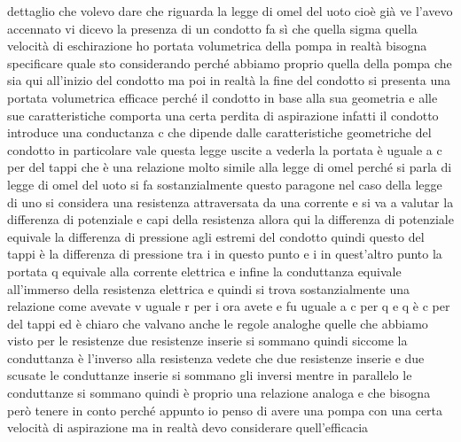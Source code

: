 dettaglio che volevo dare che riguarda la legge di omel del uoto cioè già ve l'avevo accennato vi dicevo la presenza di un condotto fa sì che quella sigma quella velocità di eschirazione ho portata volumetrica della pompa in realtà bisogna specificare quale sto considerando perché abbiamo proprio quella della pompa che sia qui all'inizio del condotto ma poi in realtà la fine del condotto si presenta una portata volumetrica efficace perché il condotto in base alla sua geometria e alle sue caratteristiche comporta una certa perdita di aspirazione infatti il condotto introduce una conductanza c che dipende dalle caratteristiche geometriche del condotto in particolare vale questa legge uscite a vederla la portata è uguale a c per del tappi che è una relazione molto simile alla legge di omel perché si parla di legge di omel del uoto si fa sostanzialmente questo paragone nel caso della legge di uno si considera una resistenza attraversata da una corrente e si va a valutar la differenza di potenziale e capi della resistenza allora qui la differenza di potenziale equivale la differenza di pressione agli estremi del condotto quindi questo del tappi è la differenza di pressione tra i in questo punto e i in quest'altro punto la portata q equivale alla corrente elettrica e infine la conduttanza equivale all'immerso della resistenza elettrica e quindi si trova sostanzialmente una relazione come avevate v uguale r per i ora avete e fu uguale a c per q e q è c per del tappi ed è chiaro che valvano anche le regole analoghe quelle che abbiamo visto per le resistenze due resistenze inserie si sommano quindi siccome la conduttanza è l'inverso alla resistenza vedete che due resistenze inserie e due scusate le conduttanze inserie si sommano gli inversi mentre in parallelo le conduttanze si sommano quindi è proprio una relazione analoga e che bisogna però tenere in conto perché appunto io penso di avere una pompa con una certa velocità di aspirazione ma in realtà devo considerare quell'efficacia

